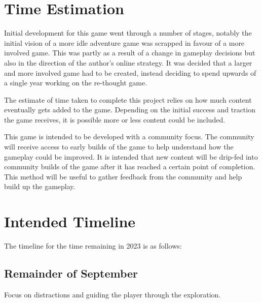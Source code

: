 \documentclass[a4paper]{scrreprt}
\begin{document}

\section{Time Estimation}

Initial development for this game went through a number of stages, notably the initial vision of a more idle adventure game was scrapped in favour of a more involved game.
This was partly as a result of a change in gameplay decisions but also in the direction of the author's online strategy.
It was decided that a larger and more involved game had to be created, instead deciding to spend upwards of a single year working on the re-thought game.

The estimate of time taken to complete this project relies on how much content eventually gets added to the game.
Depending on the initial success and traction the game receives, it is possible more or less content could be included.

This game is intended to be developed with a community focus.
The community will receive access to early builds of the game to help understand how the gameplay could be improved.
It is intended that new content will be drip-fed into community builds of the game after it has reached a certain point of completion.
This method will be useful to gather feedback from the community and help build up the gameplay.

\section{Intended Timeline}
The timeline for the time remaining in 2023 is as follows:

\subsection{Remainder of September}
Focus on distractions and guiding the player through the exploration.
\end{document}
